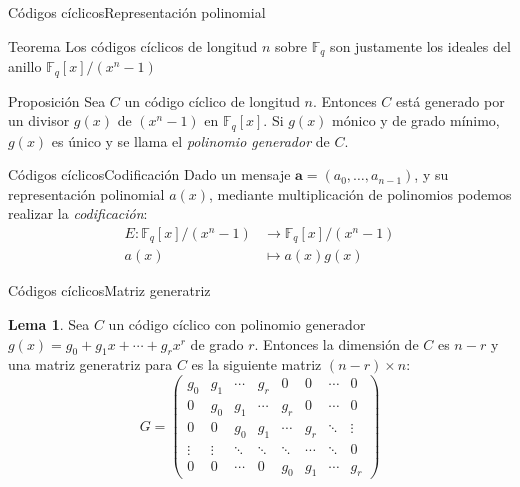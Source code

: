 \documentclass[aspectratio=43,14pt,spanish]{beamer}
\renewcommand{\a}{\mathbf{a}}
\newcommand{\Fq}{\mathbb{F}_q}
\newcommand{\Fqx}{\Fq[x]}
\newcommand{\Fx}{\Fq[x]/(x^n - 1)}
\theoremstyle{definition} %
\newtheorem{lema}{Lema}[section]
\begin{document}
    \begin{frame}{Códigos cíclicos}{Representación polinomial}
        \begin{alertblock}{Teorema}
            Los códigos cíclicos de longitud $n$ sobre $\Fq$ son justamente los ideales del anillo $\Fx$
        \end{alertblock}

        \begin{alertblock}{Proposición}
            Sea $C$ un código cíclico de longitud $n$. Entonces $C$ está generado por un divisor  $g(x)$ de $(x^n - 1)$ en $\Fqx$. Si $g(x)$ mónico y de grado mínimo, $g(x)$ es único y se llama el \emph{polinomio generador} de $C$.
        \end{alertblock}
    \end{frame}

    \begin{frame}{Códigos cíclicos}{Codificación}
        Dado un mensaje $\a = (a_0, \dots, a_{n-1})$, y su representación polinomial $a(x)$, mediante multiplicación de polinomios podemos realizar la \emph{codificación}:
        \begin{align*}
            E: \Fx &\to \Fx \\
            a(x) &\mapsto a(x)g(x)
        \end{align*}
    \end{frame}


    \begin{frame}{Códigos cíclicos}{Matriz generatriz}
        \begin{lema}
            Sea $C$ un código cíclico con polinomio generador $g(x) = g_0 + g_1 x + \cdots + g_r x^r$ de grado $r$. Entonces la dimensión de $C$ es $n - r$ y una matriz generatriz para $C$ es la siguiente matriz $(n - r) \times n$:
            $$
            G = \begin{pmatrix}
                    g_0 & g_1 & \cdots & g_r & 0 & 0 & \cdots & 0 \\
                    0 & g_0 & g_1 & \cdots & g_r & 0 & \cdots & 0 \\
                    0 & 0 & g_0 & g_1 & \cdots & g_r & \ddots & \vdots \\
                    \vdots & \vdots & \ddots & \ddots & \ddots & \cdots & \ddots & 0  \\
                    0 & 0 & \cdots & 0 & g_0 & g_1 & \cdots & g_r
                \end{pmatrix}
            $$
        \end{lema}
    \end{frame}
\end{document}
